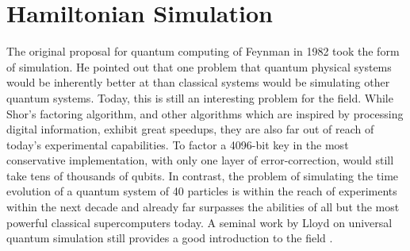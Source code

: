 \section{Hamiltonian Simulation}
\label{sec:hamsim}

The original proposal for quantum computing of Feynman in 1982 \cite{Feynman1982}
took the form of simulation. He pointed out that one problem that
quantum physical systems would be inherently better at than classical systems
would be simulating other quantum systems. Today, this is still an interesting
problem for the field. While Shor's factoring algorithm, and other algorithms
which are inspired by processing digital information, exhibit great speedups,
they are also far out of reach of today's experimental capabilities. To
factor a 4096-bit key in the most conservative implementation, with only
one layer of error-correction, would still take tens of thousands of qubits.
In contrast, the problem of simulating the time evolution of a quantum system of 40 particles
is within the reach of experiments within the next decade and already
far surpasses the abilities of all but the most powerful classical supercomputers
today. A seminal work by Lloyd on universal quantum simulation still provides a
good introduction to the field \cite{Lloyd1996}.




